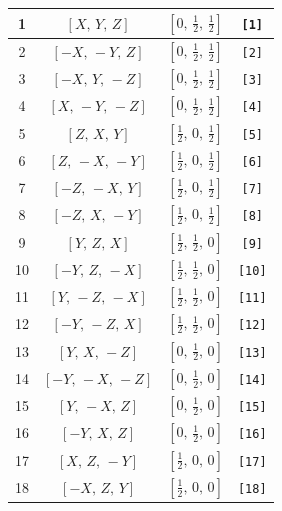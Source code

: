 \documentclass[fleqn,8pt]{jsarticle}
\begin{document}
\begin{longtable}{cccc}
1 & $\left[ X,\, Y,\, Z \right]$ & $\left[ 0,\, \frac{1}{2},\, \frac{1}{2} \right]$ & {\tt [1]} \\ \hline
2 & $\left[ - X,\, - Y,\, Z \right]$ & $\left[ 0,\, \frac{1}{2},\, \frac{1}{2} \right]$ & {\tt [2]} \\ \hline
3 & $\left[ - X,\, Y,\, - Z \right]$ & $\left[ 0,\, \frac{1}{2},\, \frac{1}{2} \right]$ & {\tt [3]} \\ \hline
4 & $\left[ X,\, - Y,\, - Z \right]$ & $\left[ 0,\, \frac{1}{2},\, \frac{1}{2} \right]$ & {\tt [4]} \\ \hline
5 & $\left[ Z,\, X,\, Y \right]$ & $\left[ \frac{1}{2},\, 0,\, \frac{1}{2} \right]$ & {\tt [5]} \\ \hline
6 & $\left[ Z,\, - X,\, - Y \right]$ & $\left[ \frac{1}{2},\, 0,\, \frac{1}{2} \right]$ & {\tt [6]} \\ \hline
7 & $\left[ - Z,\, - X,\, Y \right]$ & $\left[ \frac{1}{2},\, 0,\, \frac{1}{2} \right]$ & {\tt [7]} \\ \hline
8 & $\left[ - Z,\, X,\, - Y \right]$ & $\left[ \frac{1}{2},\, 0,\, \frac{1}{2} \right]$ & {\tt [8]} \\ \hline
9 & $\left[ Y,\, Z,\, X \right]$ & $\left[ \frac{1}{2},\, \frac{1}{2},\, 0 \right]$ & {\tt [9]} \\ \hline
10 & $\left[ - Y,\, Z,\, - X \right]$ & $\left[ \frac{1}{2},\, \frac{1}{2},\, 0 \right]$ & {\tt [10]} \\ \hline
11 & $\left[ Y,\, - Z,\, - X \right]$ & $\left[ \frac{1}{2},\, \frac{1}{2},\, 0 \right]$ & {\tt [11]} \\ \hline
12 & $\left[ - Y,\, - Z,\, X \right]$ & $\left[ \frac{1}{2},\, \frac{1}{2},\, 0 \right]$ & {\tt [12]} \\ \hline
13 & $\left[ Y,\, X,\, - Z \right]$ & $\left[ 0,\, \frac{1}{2},\, 0 \right]$ & {\tt [13]} \\ \hline
14 & $\left[ - Y,\, - X,\, - Z \right]$ & $\left[ 0,\, \frac{1}{2},\, 0 \right]$ & {\tt [14]} \\ \hline
15 & $\left[ Y,\, - X,\, Z \right]$ & $\left[ 0,\, \frac{1}{2},\, 0 \right]$ & {\tt [15]} \\ \hline
16 & $\left[ - Y,\, X,\, Z \right]$ & $\left[ 0,\, \frac{1}{2},\, 0 \right]$ & {\tt [16]} \\ \hline
17 & $\left[ X,\, Z,\, - Y \right]$ & $\left[ \frac{1}{2},\, 0,\, 0 \right]$ & {\tt [17]} \\ \hline
18 & $\left[ - X,\, Z,\, Y \right]$ & $\left[ \frac{1}{2},\, 0,\, 0 \right]$ & {\tt [18]} \\ \hline

\end{longtable}
\end{document}
